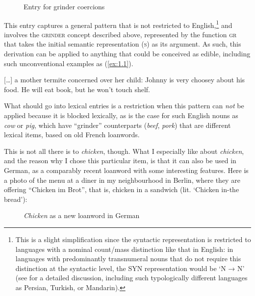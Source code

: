 \begin{figure} [H]
\caption{Entry for grinder coercions}
\label{fig:4}
\end{figure}

This entry captures a general pattern that is not restricted to English,\footnote{This is a slight simplification since the syntactic representation is restricted to languages with a nominal count/mass distinction like that in English: in languages with predominantly transnumeral nouns that do not require this distinction at the syntactic level, the SYN representation would be ‘N → N’ (see \citealt{Wiese2012_mass} for a detailed discussion, including such typologically different languages as Persian, Turkish, or Mandarin).} and involves the \textsc{grinder} concept described above, represented by the function \textsc{gr} that takes the initial semantic representation (\textsc{s}) as its argument. As such, this derivation can be applied to anything that could be conceived as edible, including such unconventional examples as (\ref{ex:1.1}).

\ea{}
\label{ex:1.1}
[…] a mother termite concerned over her child: Johnny is very choosey about his food. He will eat book, but he won’t touch shelf. \citep[136]{Gleason1965}\\
\z

What should go into lexical entries is a restriction when this pattern can \textit{not} be applied because it is blocked lexically, as is the case for such English nouns as \textit{cow} or \textit{pig}, which have ``grinder'' counterparts (\textit{beef}, \textit{pork}) that are different lexical items, based on old French loanwords.

This is not all there is to \textit{chicken}, though. What I especially like about \textit{chicken}, and the reason why I chose this particular item, is that it can also be used in German, as a comparably recent loanword with some interesting features. Here is a photo of the menu at a diner in my neighbourhood in Berlin, where they are offering “Chicken im Brot”, that is, chicken in a sandwich (lit. ‘Chicken in-the bread’):

\begin{figure}[H]
\caption{\textit{Chicken} as a new loanword in German}
\label{fig:5}
\end{figure}


